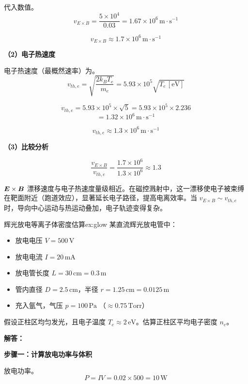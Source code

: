代入数值。
\[
    v_{E\times B} = \frac{5\times10^4}{0.03} = 1.67\times10^6\,\mathrm{m\cdot s^{-1}}
\]

\[
    \boxed{v_{E\times B} \approx 1.7\times10^6\,\mathrm{m\cdot s^{-1}}}
\]

\textbf{（2）电子热速度}

电子热速度（最概然速率）为。
\begin{equation}
    v_{th,e} = \sqrt{\frac{2 k_B T_e}{m_e}} = 5.93\times10^5 \sqrt{T_e\,[\mathrm{eV}]}
\label{eq:ch11-thermal-velocity}
\end{equation}

\[
    v_{th,e} = 5.93\times10^5 \times \sqrt{5} = 5.93\times10^5 \times 2.236
\]
\[
    = 1.32\times10^6\,\mathrm{m\cdot s^{-1}}
\]

\[
    \boxed{v_{th,e} \approx 1.3\times10^6\,\mathrm{m\cdot s^{-1}}}
\]

\textbf{（3）比较分析}

\[
    \frac{v_{E\times B}}{v_{th,e}} = \frac{1.7\times10^6}{1.3\times10^6} \approx 1.3
\]

$\bm{E}\times\bm{B}$ 漂移速度与电子热速度量级相近。在磁控溅射中，这一漂移使电子被束缚在靶面附近（跑道效应），显著延长电子路径，提高电离效率。当 $v_{E\times B} \sim v_{th,e}$ 时，导向中心运动与热运动叠加，电子轨迹变得复杂。


\begin{example}{辉光放电等离子体密度估算}{ex:glow}
某直流辉光放电管中：
\begin{itemize}
    \item 放电电压 $V = 500\,\mathrm{V}$
    \item 放电电流 $I = 20\,\mathrm{mA}$
    \item 放电管长度 $L = 30\,\mathrm{cm} = 0.3\,\mathrm{m}$
    \item 管内直径 $D = 2.5\,\mathrm{cm}$，半径 $r = 1.25\,\mathrm{cm} = 0.0125\,\mathrm{m}$
    \item 充入氩气，气压 $p = 100\,\mathrm{Pa}$ （$\approx 0.75\,\mathrm{Torr}$）
\end{itemize}
假设正柱区均匀发光，且电子温度 $T_e \approx 2\,\mathrm{eV}$。估算正柱区平均电子密度 $n_e$。
\end{example}

\textbf{解答：}

\textbf{步骤一：计算放电功率与体积}

放电功率。
\[
    P = I V = 0.02 \times 500 = 10\,\mathrm{W}
\]

